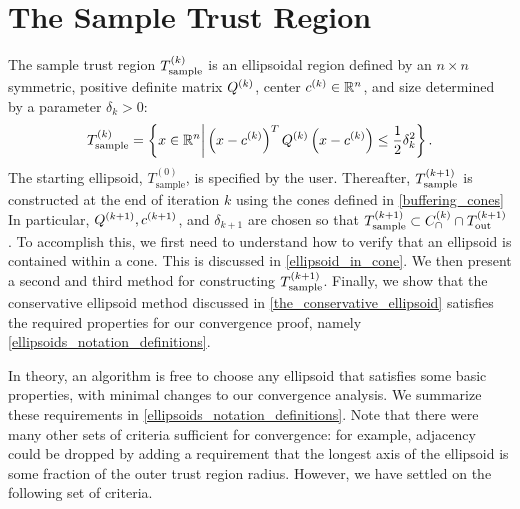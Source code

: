 \section{The Sample Trust Region}
\label{possible_ellipsoids}
The sample trust region ${T_{\text{sample}}^{(k)}}$ is an ellipsoidal region defined by an $n\times n$ symmetric, positive definite matrix ${Q^{(k)}}$, center $c^{(k)} \in \mathbb R^n$, 
and size determined by a parameter $\delta_{k} > 0$:
\begin{align}
{T_{\text{sample}}^{(k)}} = \left \{x \in \mathbb R^n \bigg | \left(x - c^{(k)}\right)^T {Q^{(k)}}\left(x - c^{(k)}\right) \le \frac 1 2 \delta_k^2 \right \}. \label{define_sampletrk}
\end{align}
The starting ellipsoid,  $T_{\text{sample}}^{(0)}$,  is specified by the user.
Thereafter,  ${T_{\text{sample}}^{(k+1)}}$ is constructed at the end of iteration $k$ using the cones defined in \cref{buffering_cones}
In particular,  ${Q^{(k+1)}},{c^{(k+1)}}$, and $\delta_{k+1}$ are chosen so that ${T_{\text{sample}}^{(k+1)}}  \subset {C^{(k)}_{\cap}} \cap {T_{\text{out}}^{(k+1)}}$.
To accomplish this, we first need to understand how to verify that an ellipsoid is contained within a cone.
This is discussed in \cref{ellipsoid_in_cone}.
We then present a second and third method for constructing ${T_{\text{sample}}^{(k+1)}}$.
Finally, we show that the conservative ellipsoid method discussed in \cref{the_conservative_ellipsoid} satisfies the 
required properties for our convergence proof, namely \cref{ellipsoids_notation_definitions}.

In theory, an algorithm is free to choose any ellipsoid that satisfies some basic properties, with minimal changes to our convergence analysis.
We summarize these requirements in \cref{ellipsoids_notation_definitions}.
Note that there were many other sets of criteria sufficient for convergence:
for example, adjacency could be dropped by adding a requirement that the longest axis of the ellipsoid is some fraction of the outer trust region radius.
However, we have settled on the following set of criteria.


